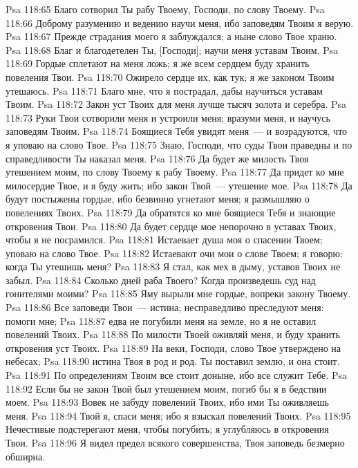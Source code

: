 \vs Psa 118:65 Благо сотворил Ты рабу Твоему, Господи, по слову Твоему.
\vs Psa 118:66 Доброму разумению и ведению научи меня, ибо заповедям Твоим я верую.
\vs Psa 118:67 Прежде страдания моего я заблуждался; а ныне слово Твое храню.
\vs Psa 118:68 Благ и благодетелен Ты, [Господи]; научи меня уставам Твоим.
\vs Psa 118:69 Гордые сплетают на меня ложь; я же всем сердцем буду хранить повеления Твои.
\vs Psa 118:70 Ожирело сердце их, как тук; я же законом Твоим утешаюсь.
\vs Psa 118:71 Благо мне, что я пострадал, дабы научиться уставам Твоим.
\vs Psa 118:72 Закон уст Твоих для меня лучше тысяч золота и серебра.
\rsbpar\vs Psa 118:73 Руки Твои сотворили меня и устроили меня; вразуми меня, и научусь заповедям Твоим.
\vs Psa 118:74 Боящиеся Тебя увидят меня~--- и возрадуются, что я уповаю на слово Твое.
\vs Psa 118:75 Знаю, Господи, что суды Твои праведны и по справедливости Ты наказал меня.
\vs Psa 118:76 Да будет же милость Твоя утешением моим, по слову Твоему к рабу Твоему.
\vs Psa 118:77 Да придет ко мне милосердие Твое, и я буду жить; ибо закон Твой~--- утешение мое.
\vs Psa 118:78 Да будут постыжены гордые, ибо безвинно угнетают меня; я размышляю о повелениях Твоих.
\vs Psa 118:79 Да обратятся ко мне боящиеся Тебя и знающие откровения Твои.
\vs Psa 118:80 Да будет сердце мое непорочно в уставах Твоих, чтобы я не посрамился.
\vs Psa 118:81 Истаевает душа моя о спасении Твоем; уповаю на слово Твое.
\vs Psa 118:82 Истаевают очи мои о слове Твоем; я говорю: когда Ты утешишь меня?
\vs Psa 118:83 Я стал, как мех в дыму,  уставов Твоих не забыл.
\vs Psa 118:84 Сколько дней раба Твоего? Когда произведешь суд над гонителями моими?
\vs Psa 118:85 Яму вырыли мне гордые, вопреки закону Твоему.
\vs Psa 118:86 Все заповеди Твои~--- истина; несправедливо преследуют меня: помоги мне;
\vs Psa 118:87 едва не погубили меня на земле, но я не оставил повелений Твоих.
\vs Psa 118:88 По милости Твоей оживляй меня, и буду хранить откровения уст Твоих.
\vs Psa 118:89 На веки, Господи, слово Твое утверждено на небесах;
\vs Psa 118:90 истина Твоя в род и род. Ты поставил землю, и она стоит.
\vs Psa 118:91 По определениям Твоим все стоит доныне, ибо все служит Тебе.
\vs Psa 118:92 Если бы не закон Твой был утешением моим, погиб бы я в бедствии моем.
\vs Psa 118:93 Вовек не забуду повелений Твоих, ибо ими Ты оживляешь меня.
\vs Psa 118:94 Твой я, спаси меня; ибо я взыскал повелений Твоих.
\vs Psa 118:95 Нечестивые подстерегают меня, чтобы погубить;  я углубляюсь в откровения Твои.
\vs Psa 118:96 Я видел предел всякого совершенства,  Твоя заповедь безмерно обширна.
